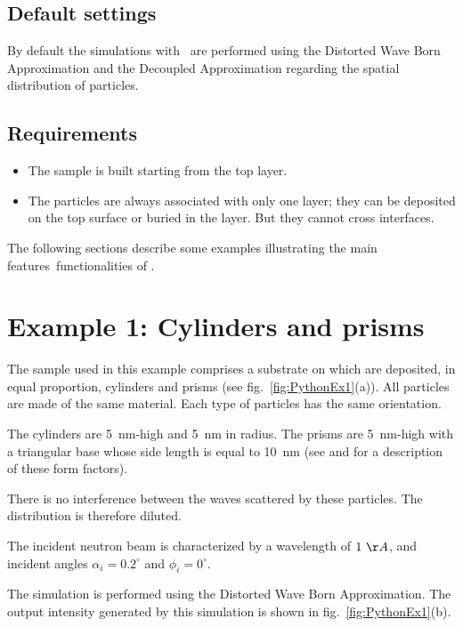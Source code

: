 \subsection{Default settings}
By default the simulations with \BornAgain\ are performed using the Distorted Wave Born Approximation and the Decoupled Approximation regarding the spatial distribution of particles.


\subsection{Requirements}
\begin{itemize}
  \item The sample is built starting from the top layer.
  \item The particles are always associated with only one layer; they can be deposited on the top surface or buried in the layer. But they cannot cross interfaces.
\end{itemize}
The following sections describe some examples illustrating the main features\ functionalities of \BornAgain .


\newpage
\section{Example 1: Cylinders and prisms}
The sample used in this example comprises a substrate on which are deposited, in equal proportion, cylinders and prisms (see fig.~\ref{fig:PythonEx1}(a)). All particles are made of the same material. Each type of particles has the same orientation.

The cylinders are 5~nm-high and 5~nm in radius. The prisms are 5~nm-high with a triangular base whose side length is equal to 10~nm (see  and  for a description of these form factors). 

There is no interference between the waves scattered by these particles. The distribution is therefore diluted.

The incident neutron beam is characterized by a wavelength of $1~\AA$, and incident angles $\alpha_i=0.2^{\circ}$ and $\phi_i=0^{\circ}$.

The simulation is performed using the Distorted Wave Born Approximation. The output intensity generated by this simulation is shown in fig.~\ref{fig:PythonEx1}(b).


